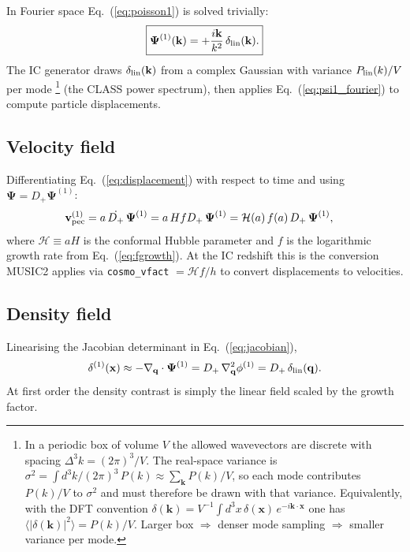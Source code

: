 \documentclass[12pt]{article}
\newcommand{\bq}{\mathbf{q}}
\newcommand{\bx}{\mathbf{x}}
\newcommand{\bk}{\mathbf{k}}
\newcommand{\bPsi}{\boldsymbol{\Psi}}
\newcommand{\bv}{\mathbf{v}}
\newcommand{\Dp}{D_+}
\newcommand{\calH}{\mathcal{H}}
\begin{document}
In Fourier space Eq.~(\ref{eq:poisson1}) is solved trivially:
%
\begin{equation}
  \boxed{
  \bPsi^{(1)}(\bk) = +\frac{i\bk}{k^2}\,\delta_{\rm lin}(\bk).
  }
  \label{eq:psi1_fourier}
\end{equation}
%
The IC generator draws $\delta_{\rm lin}(\bk)$ from a complex Gaussian with
variance $P_{\rm lin}(k)/V$ per mode%
\footnote{In a periodic box of volume $V$ the allowed wavevectors are
  discrete with spacing $\Delta^3k=(2\pi)^3/V$.  The real-space variance
  is $\sigma^2=\int d^3k/(2\pi)^3\,P(k)\approx\sum_\bk P(k)/V$,
  so each mode contributes $P(k)/V$ to $\sigma^2$ and must therefore
  be drawn with that variance.  Equivalently, with the DFT convention
  $\delta(\bk)=V^{-1}\!\int d^3x\,\delta(\bx)\,e^{-i\bk\cdot\bx}$
  one has $\langle|\delta(\bk)|^2\rangle=P(k)/V$.
  Larger box $\Rightarrow$ denser mode sampling $\Rightarrow$ smaller variance per mode.}
(the CLASS power spectrum), then applies
Eq.~(\ref{eq:psi1_fourier}) to compute particle displacements.

\subsection{Velocity field}

Differentiating Eq.~(\ref{eq:displacement}) with respect to time and
using $\bPsi = \Dp\bPsi^{(1)}$:
%
\begin{align}
  \bv_{\rm pec}^{(1)}
    &= a\,\dot{\Dp}\,\bPsi^{(1)}
     = a\,Hf\Dp\,\bPsi^{(1)}
     = \calH(a)\,f(a)\,\Dp\,\bPsi^{(1)},
  \label{eq:vel1}
\end{align}
%
where $\calH \equiv aH$ is the conformal Hubble parameter and $f$ is
the logarithmic growth rate from Eq.~(\ref{eq:fgrowth}).  At the IC
redshift this is the conversion MUSIC2 applies via
\texttt{cosmo\_vfact} $= \calH f / h$ to convert displacements to
velocities.

\subsection{Density field}

Linearising the Jacobian determinant in Eq.~(\ref{eq:jacobian}),
%
\begin{equation}
  \delta^{(1)}(\bx) \approx -\nabla_\bq\cdot\bPsi^{(1)}
  = \Dp\,\nabla_\bq^2\phi^{(1)}
  = \Dp\,\delta_{\rm lin}(\bq).
\end{equation}
%
At first order the density contrast is simply the linear field scaled
by the growth factor.
\end{document}
